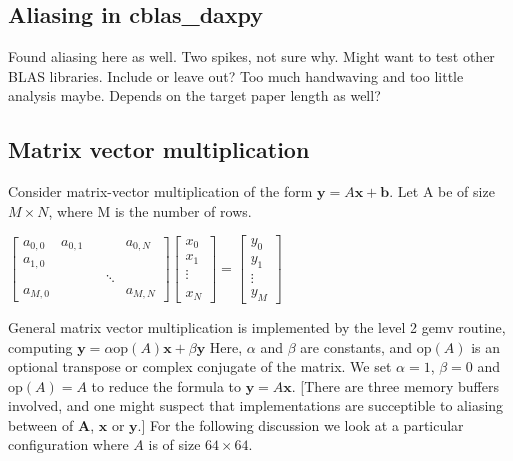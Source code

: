 \documentclass[a4paper,10pt,twocolumn,twoside]{article}
\begin{document}
\subsection{Aliasing in cblas\_daxpy}
Found aliasing here as well. Two spikes, not sure why. Might want to test other BLAS libraries. Include or leave out? Too much handwaving and too little analysis maybe. Depends on the target paper length as well?



\subsection{Matrix vector multiplication}

Consider matrix-vector multiplication of the form $\boldsymbol{y} = A\boldsymbol{x} + \boldsymbol{b}$.
Let A be of size $M \times N$, where M is the number of rows. 

$
\left[\begin{array}{ccccc}
a_{0,0} & a_{0,1} &  &  & a_{0,N}\\
a_{1,0}\\
 &  &  & \ddots\\
a_{M,0} &  &  &  & a_{M,N}
\end{array}\right]\left[\begin{array}{c}
x_{0}\\
x_{1}\\
\vdots\\
\\
x_{N}
\end{array}\right]=\left[\begin{array}{c}
y_{0}\\
y_{1}\\
\vdots\\
y_{M}
\end{array}\right]
$

General matrix vector multiplication is implemented by the level 2 gemv routine, computing $\boldsymbol{y} = \alpha\text{op}\left(A\right)\boldsymbol{x} + \beta\boldsymbol{y}$
Here, $\alpha$ and $\beta$ are constants, and $\text{op}\left(A\right)$ is an optional transpose or complex conjugate of the matrix. 
We set $\alpha = 1$, $\beta = 0$ and $\text{op} \left(A\right) = A$ to reduce the formula to $\boldsymbol{y}=A\boldsymbol{x}$.
[There are three memory buffers involved, and one might suspect that implementations are succeptible to aliasing between of $\boldsymbol{A}$, $\boldsymbol{x}$ or $\boldsymbol{y}$.]
For the following discussion we look at a particular configuration where $A$ is of size $64\times64$.
\end{document}
